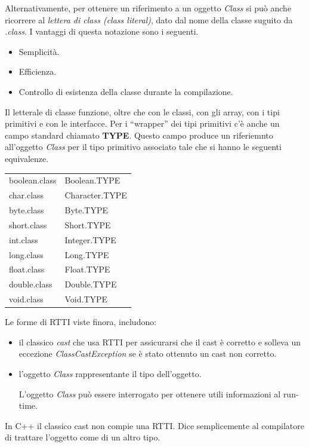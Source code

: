 \documentclass[12pt]{report}
\begin{document}
Alternativamente, per ottenere un riferimento a un oggetto \textit{Class} si può anche ricorrere al \textit{lettera di class (class literal)}, dato dal nome della classe suguito da \textit{.class}. I vantaggi di questa notazione sono i seguenti.
\begin{itemize}
	\item Semplicità.
	\item Efficienza.
	\item Controllo di esistenza della classe durante la compilazione.
\end{itemize}
Il letterale di classe funzione, oltre che con le classi, con gli array, con i tipi primitivi e con le interfacce.
Per i ``wrapper'' dei tipi primitivi c'è anche un campo standard chiamato \textbf{TYPE}. Questo campo produce un riferiemnto all'oggetto \textit{Class} per il tipo primitivo associato tale che si hanno le seguenti equivalenze.
\begin{table}[H]
	\begin{center}
		\begin{tabular}[c]{|l|l|}
			\hline
			boolean.class & Boolean.TYPE \\
			char.class & Character.TYPE \\
			byte.class & Byte.TYPE \\
			short.class & Short.TYPE \\
			int.class & Integer.TYPE \\
			long.class & Long.TYPE \\
			float.class & Float.TYPE \\
			double.class & Double.TYPE \\
			void.class & Void.TYPE \\
			\hline
		\end{tabular}
	\end{center}
\end{table}
Le forme di RTTI viste finora, includono:
\begin{itemize}
	\item il classico \textit{cast} che usa RTTI per assicurarsi che il cast è corretto e solleva un eccezione \textit{ClassCastException} se è stato ottenuto un cast non corretto.
	\item l'oggetto \textit{Class} rappresentante il tipo dell'oggetto.

	L'oggetto \textit{Class} può essere interrogato per ottenere utili informazioni al run-time.
\end{itemize}
In C++ il classico cast non compie una RTTI. Dice semplicemente al compilatore di trattare l'oggetto come di un altro tipo.
\end{document}
